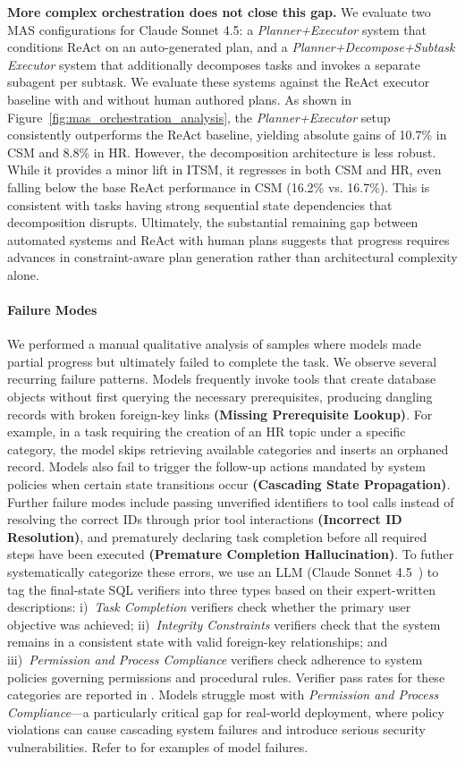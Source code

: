 \textbf{More complex orchestration does not close this gap.} We evaluate two MAS configurations for Claude Sonnet 4.5: a \textit{Planner+Executor} system that conditions ReAct on an auto-generated plan, and a \textit{Planner+Decompose+Subtask Executor} system that additionally decomposes tasks and invokes a separate subagent per subtask. We evaluate these systems against the ReAct executor baseline with and without human authored plans. As shown in Figure~\ref{fig:mas_orchestration_analysis}, the \textit{Planner+Executor} setup consistently outperforms the ReAct baseline, yielding absolute gains of 10.7\% in CSM and 8.8\% in HR. However, the decomposition architecture is less robust. While it provides a minor lift in ITSM, it regresses in both CSM and HR, even falling below the base ReAct performance in CSM (16.2\% vs. 16.7\%). This is consistent with \ours{} tasks having strong sequential state dependencies that decomposition disrupts. Ultimately, the substantial remaining gap between automated systems and ReAct with human plans suggests that progress requires advances in constraint-aware plan generation rather than architectural complexity alone.

\paragraph{Failure Modes}
We performed a manual qualitative analysis of samples where models made partial progress but ultimately failed to complete the task. We observe several recurring failure patterns. Models frequently invoke tools that create database objects without first querying the necessary prerequisites, producing dangling records with broken foreign-key links \textbf{(Missing Prerequisite Lookup)}. For example, in a task requiring the creation of an HR topic under a specific category, the model skips retrieving available categories and inserts an orphaned record. Models also fail to trigger the follow-up actions mandated by system policies when certain state transitions occur \textbf{(Cascading State Propagation)}. Further failure modes include passing unverified identifiers to tool calls instead of resolving the correct IDs through prior tool interactions \textbf{(Incorrect ID Resolution)}, and prematurely declaring task completion before all required steps have been executed \textbf{(Premature Completion Hallucination)}. To futher systematically categorize these errors, we use an LLM (Claude Sonnet 4.5~\cite{claudeopus}) to tag the final-state SQL verifiers into three types based on their expert-written descriptions: i)~\textit{Task Completion} verifiers check whether the primary user objective was achieved; ii)~\textit{Integrity Constraints} verifiers check that the system remains in a consistent state with valid foreign-key relationships; and iii)~\textit{Permission and Process Compliance} verifiers check adherence to system policies governing permissions and procedural rules. Verifier pass rates for these categories are reported in . Models struggle most with \textit{Permission and Process Compliance}---a particularly critical gap for real-world deployment, where policy violations can cause cascading system failures and introduce serious security vulnerabilities. Refer to  for examples of model failures.
